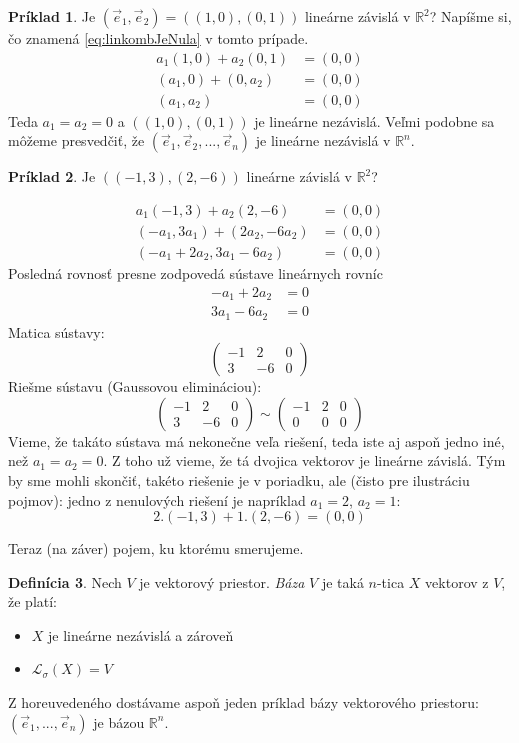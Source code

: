 \documentclass[11pt,a4paper]{article}
\theoremstyle{definition}
\newtheorem{definicia}{Definícia}[section]
\newtheorem{priklad}[definicia]{Príklad}
\theoremstyle{plain}
\theoremstyle{remark}
\newcommand{\R}{\mathbb{R}}
\newcommand{\Lo}{\mathcal{L}_\sigma} %
\begin{document}
\begin{priklad}
Je $(\vec{e}_{1},\vec{e}_{2})=((1,0),(0,1))$ lineárne závislá v $\R^{2}$? Napíšme si,
čo znamená \eqref{eq:linkombJeNula} v tomto prípade.
    \begin{align*}
    a_{1}(1,0)+a_{2}(0,1) &= (0,0) \\
    (a_{1},0)+(0,a_{2}) &= (0,0) \\
    (a_{1},a_{2}) &= (0,0)
    \end{align*}
    Teda $a_1=a_2=0$ a $((1,0), (0,1))$ je lineárne nezávislá.
    Veľmi podobne sa môžeme presvedčiť, že $(\vec{e}_{1},\vec{e}_{2},...,\vec{e}_{n})$ je lineárne nezávislá v $\R^{n}$.
\end{priklad}
\begin{priklad}
    Je $((-1,3), (2,-6))$ lineárne závislá v $\R^2$?

    \begin{align*}
    a_{1}(-1,3)+a_{2}(2,-6) &= (0,0) \\
    (-a_{1},3a_{1})+(2a_{2},-6a_{2}) &= (0,0) \\
    (-a_{1}+2a_{2}, 3a_{1}-6a_{2}) &= (0,0)
    \end{align*}
    Posledná rovnosť presne zodpovedá sústave lineárnych rovníc
    \begin{align*}
    -a_{1}+2a_{2} &= 0 \\
    3a_{1}-6a_{2} &= 0
    \end{align*}
    Matica sústavy:
    $$ 
    \left(\begin{array}{rr|r}
    -1&2&0\\ 3&-6&0
    \end{array}\right)
    $$
    Riešme sústavu (Gaussovou elimináciou):
    $$ 
    \left(\begin{array}{rr|r}
    -1&2&0\\ 3&-6&0
    \end{array}\right)
    \sim 
    \left(\begin{array}{rr|r}
    -1&2&0\\
    0&0&0
    \end{array}\right)
    $$
    Vieme, že takáto sústava má nekonečne veľa riešení, teda iste aj aspoň jedno iné, než $a_{1}=a_{2}=0$.
    Z toho už vieme, že tá dvojica vektorov je lineárne závislá. Tým by sme mohli
    skončiť, takéto riešenie je v poriadku, ale (čisto pre ilustráciu pojmov): jedno z nenulových riešení je napríklad $a_1=2$, $a_2=1$:
    $$ 2.(-1,3)+1.(2,-6)=(0,0) $$
\end{priklad}

Teraz (na záver) pojem, ku ktorému smerujeme.

\begin{definicia}\label{def:baza}
Nech $V$ je vektorový priestor. \emph{Báza} $V$ je taká $n$-tica $X$ vektorov z $V$, že platí:
\begin{itemize}
    \item $X$ je lineárne nezávislá a zároveň
    \item $\Lo(X)=V$
\end{itemize}
\end{definicia}

Z horeuvedeného dostávame aspoň jeden príklad bázy vektorového priestoru: $(\vec{e}_{1},...,\vec{e}_{n})$ je bázou $\R^n$.
\end{document}
